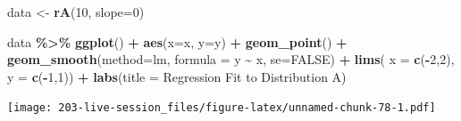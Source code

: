 \documentclass[
]{book}
\newenvironment{Shaded}{\begin{snugshade}}{\end{snugshade}}
\newcommand{\AttributeTok}[1]{\textcolor[rgb]{0.13,0.29,0.53}{#1}}
\newcommand{\ConstantTok}[1]{\textcolor[rgb]{0.56,0.35,0.01}{#1}}
\newcommand{\DecValTok}[1]{\textcolor[rgb]{0.00,0.00,0.81}{#1}}
\newcommand{\FunctionTok}[1]{\textcolor[rgb]{0.13,0.29,0.53}{\textbf{#1}}}
\newcommand{\NormalTok}[1]{#1}
\newcommand{\OtherTok}[1]{\textcolor[rgb]{0.56,0.35,0.01}{#1}}
\newcommand{\SpecialCharTok}[1]{\textcolor[rgb]{0.81,0.36,0.00}{\textbf{#1}}}
\newcommand{\StringTok}[1]{\textcolor[rgb]{0.31,0.60,0.02}{#1}}
\theoremstyle{definition}
\theoremstyle{definition}
\theoremstyle{definition}
\theoremstyle{definition}
\theoremstyle{remark}
\begin{document}
\begin{Shaded}
\begin{Highlighting}[]
\NormalTok{data }\OtherTok{\textless{}{-}}  \FunctionTok{rA}\NormalTok{(}\DecValTok{10}\NormalTok{, }\AttributeTok{slope=}\DecValTok{0}\NormalTok{)}

\NormalTok{data }\SpecialCharTok{\%\textgreater{}\%} 
  \FunctionTok{ggplot}\NormalTok{() }\SpecialCharTok{+} 
  \FunctionTok{aes}\NormalTok{(}\AttributeTok{x=}\NormalTok{x, }\AttributeTok{y=}\NormalTok{y) }\SpecialCharTok{+} 
  \FunctionTok{geom\_point}\NormalTok{() }\SpecialCharTok{+} 
  \FunctionTok{geom\_smooth}\NormalTok{(}\AttributeTok{method=}\StringTok{\textquotesingle{}lm\textquotesingle{}}\NormalTok{, }\AttributeTok{formula =} \StringTok{\textquotesingle{}y \textasciitilde{} x\textquotesingle{}}\NormalTok{, }\AttributeTok{se=}\ConstantTok{FALSE}\NormalTok{) }\SpecialCharTok{+} 
  \FunctionTok{lims}\NormalTok{(}
    \AttributeTok{x =} \FunctionTok{c}\NormalTok{(}\SpecialCharTok{{-}}\DecValTok{2}\NormalTok{,}\DecValTok{2}\NormalTok{), }
    \AttributeTok{y =} \FunctionTok{c}\NormalTok{(}\SpecialCharTok{{-}}\DecValTok{1}\NormalTok{,}\DecValTok{1}\NormalTok{)) }\SpecialCharTok{+} 
  \FunctionTok{labs}\NormalTok{(}\AttributeTok{title =} \StringTok{\textquotesingle{}Regression Fit to Distribution A\textquotesingle{}}\NormalTok{)}
\end{Highlighting}
\end{Shaded}

\texttt{[image: 203-live-session\_files/figure-latex/unnamed-chunk-78-1.pdf]}
\end{document}
